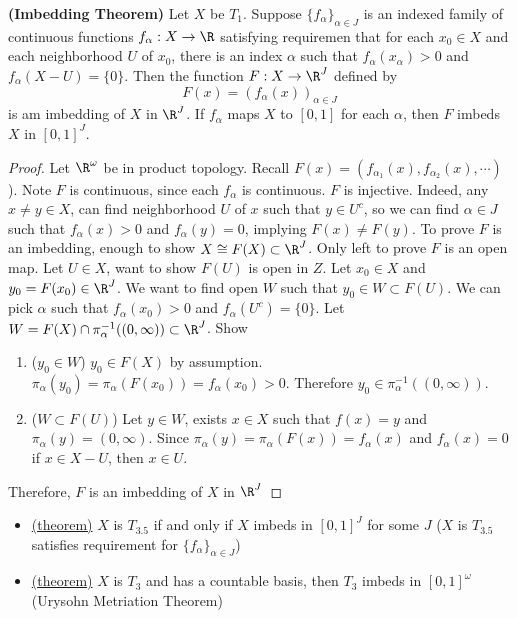 \documentclass[10.5pt]{article}
\begin{document}
\begin{theorem*}
    \textbf{(Imbedding Theorem)} Let $X$ be $T_1$. Suppose $\{f_{\alpha}\}_{\alpha\in J}$ is an indexed family of continuous functions $f_{\alpha}: X\to\R$ satisfying requiremen that for each $x_0\in X$ and each neighborhood $U$ of $x_0$, there is an index $\alpha$ such that $f_{\alpha}(x_{\alpha}) > 0$ and $f_{\alpha}(X-U) = \{0\}$. Then the function $F:X\to\R^J$ defined by 
    \[
        F(x) = (f_{\alpha}(x))_{\alpha\in J}
    \]
    is am imbedding of $X$ in $\R^J$. If $f_{\alpha}$ maps $X$ to $[0,1]$ for each $\alpha$, then $F$ imbeds $X$ in $[0,1]^J$.
    \begin{proof}
        Let $\R^{\omega}$ be in product topology. Recall $F(x) = (f_{\alpha_1}(x), f_{\alpha_2}(x), \cdots)$). Note $F$ is continuous, since each $f_{\alpha}$ is continuous. $F$ is injective. Indeed, any $x\neq y\in X$, can find neighborhood $U$ of $x$ such that $y\in U^c$, so we can find $\alpha \in J$ such that $f_{\alpha}(x) > 0$ and $f_{\alpha}(y) = 0$, implying $F(x)\neq F(y)$. To prove $F$ is an imbedding, enough to show $X\cong F(X)\subset\R^J$. Only left to prove $F$ is an open map. Let $U\in X$, want to show $F(U)$ is open in $Z$. Let $x_0\in X$ and $y_0=F(x_0)\in \R^J$. We want to find open $W$ such that $y_0\in W\subset F(U)$. We can pick $\alpha$ such that $f_{\alpha} (x_0) > 0$ and $f_{\alpha}(U^c) = \{0\}$. Let $W = F(X) \cap \pi_{\alpha}^{-1}((0, \infty)) \subset \R^J$. Show
        \begin{enumerate}
            \item ($y_0\in W$) $y_0 \in F(X)$ by assumption. $\pi_{\alpha}(y_0) = \pi_{\alpha}(F(x_0)) = f_{\alpha}(x_0) > 0$. Therefore $y_0 \in \pi_{\alpha}^{-1}((0, \infty))$. 
            \item ($W\subset F(U)$) Let $y\in W$, exists $x\in X$ such that $f(x) = y$ and $\pi_{\alpha}(y) = (0, \infty)$. Since $\pi_{\alpha}(y) = \pi_{\alpha}(F(x)) = f_{\alpha}(x)$ and $f_{\alpha}(x) = 0$ if $x\in X-U$, then $x\in U$.
        \end{enumerate}
        Therefore, $F$ is an imbedding of $X$ in $\R^J$ 
    \end{proof}
    \begin{itemize}
        \item \underline{(theorem)} $X$ is $T_{3.5}$ if and only if $X$ imbeds in $[0,1]^J$ for some $J$ ($X$ is $T_{3.5}$ satisfies requirement for $\{f_{\alpha}\}_{\alpha\in J}$)
        \item \underline{(theorem)} $X$ is $T_3$ and has a countable basis, then $T_3$ imbeds in $[0,1]^{\omega}$ (Urysohn Metriation Theorem)
    \end{itemize}
\end{theorem*}
\end{document}
